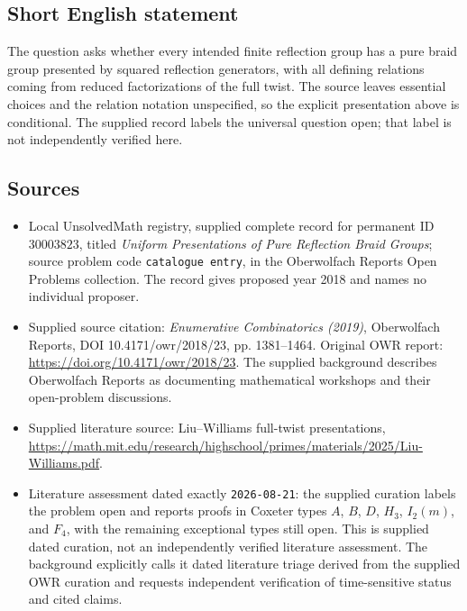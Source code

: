 \documentclass[11pt]{article}
\begin{document}
\subsection{Short English statement}
The question asks whether every intended finite reflection group has a pure braid group presented by squared reflection generators, with all defining relations coming from reduced factorizations of the full twist. The source leaves essential choices and the relation notation unspecified, so the explicit presentation above is conditional. The supplied record labels the universal question open; that label is not independently verified here.
\subsection{Sources}
\begin{itemize}
\item Local UnsolvedMath registry, supplied complete record for permanent ID \(30003823\), titled \emph{Uniform Presentations of Pure Reflection Braid Groups}; source problem code \texttt{catalogue entry}, in the Oberwolfach Reports Open Problems collection. The record gives proposed year 2018 and names no individual proposer.
\item Supplied source citation: \emph{Enumerative Combinatorics (2019)}, Oberwolfach Reports, DOI 10.4171/owr/2018/23, pp. 1381--1464. Original OWR report: \url{https://doi.org/10.4171/owr/2018/23}. The supplied background describes Oberwolfach Reports as documenting mathematical workshops and their open-problem discussions.
\item Supplied literature source: Liu--Williams full-twist presentations, \url{https://math.mit.edu/research/highschool/primes/materials/2025/Liu-Williams.pdf}.
\item Literature assessment dated exactly \texttt{2026-08-21}: the supplied curation labels the problem open and reports proofs in Coxeter types \(A\), \(B\), \(D\), \(H_3\), \(I_2(m)\), and \(F_4\), with the remaining exceptional types still open. This is supplied dated curation, not an independently verified literature assessment. The background explicitly calls it dated literature triage derived from the supplied OWR curation and requests independent verification of time-sensitive status and cited claims.
\end{itemize}
\end{document}
